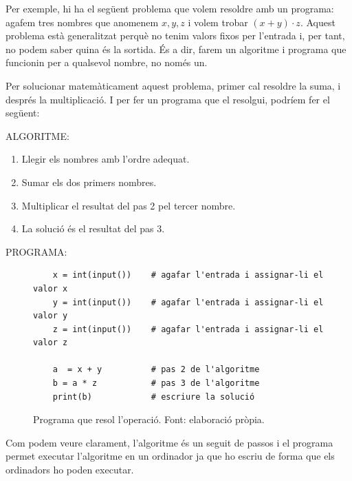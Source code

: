 Per exemple, hi ha el següent problema que volem resoldre amb un programa: agafem tres nombres que anomenem $x, y, z$ i volem trobar $(x+y)\cdot z$. Aquest problema està generalitzat perquè no tenim valors fixos per l'entrada i, per tant, no podem saber quina és la sortida. És a dir, farem un algoritme i programa que funcionin per a qualsevol nombre, no només un.

Per solucionar matemàticament aquest problema, primer cal resoldre la suma, i després la multiplicació. I per fer un programa que el resolgui, podríem fer el següent:

ALGORITME:
\begin{enumerate}
    \item Llegir els nombres amb l'ordre adequat.
    \item Sumar els dos primers nombres.
    \item Multiplicar el resultat del pas 2 pel tercer nombre.
    \item La solució és el resultat del pas 3.
\end{enumerate}

PROGRAMA:
\begin{figure}[h]
    \begin{verbatim}
    x = int(input())    # agafar l'entrada i assignar-li el valor x
    y = int(input())    # agafar l'entrada i assignar-li el valor y
    z = int(input())    # agafar l'entrada i assignar-li el valor z
    
    a  = x + y          # pas 2 de l'algoritme
    b = a * z           # pas 3 de l'algoritme
    print(b)            # escriure la solució
    \end{verbatim}
    \caption[Programa que resol l'operació.]{Programa que resol l'operació\footnotemark. Font: elaboració pròpia.}
    \label{Figura}
\end{figure}

Com podem veure clarament, l'algoritme és un seguit de passos i el programa permet executar l'algoritme en un ordinador ja que ho escriu de forma que els ordinadors ho poden executar. 

